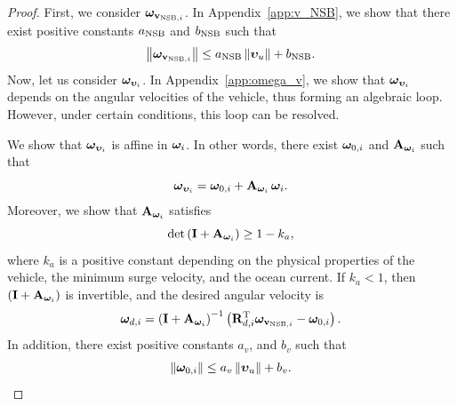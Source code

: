 \begin{proof}
    
    
    First, we consider $\bm{\omega}_{\mathbf{v}_{{\rm NSB}, i}}$.
    In Appendix~\ref{app:v_NSB}, we show that there exist positive constants $a_{\rm NSB}$ and $b_{\rm NSB}$ such that 
    \begin{equation}
        \left\|\bm{\omega}_{\mathbf{v}_{{\rm NSB}, i}}\right\| \leq a_{\rm NSB}\left\|\bm{\upsilon}_u\right\| + b_{\rm NSB}.
        \label{eq:NSB_R_omega_NSB_bound}
    \end{equation}
    Now, let us consider $\bm{\omega}_{\bm{\upsilon}_i}$.
    In Appendix~\ref{app:omega_v}, we show that $\bm{\omega}_{\bm{\upsilon}_i}$ depends on the angular velocities of the vehicle, thus forming an algebraic loop.
    However, under certain conditions, this loop can be resolved.

    

    We show that $\bm{\omega}_{\bm{\upsilon}_{i}}$ is affine in $\bm{\omega}_i$.
    In other words, there exist $\bm{\omega}_{0, i}$ and $\mathbf{A}_{\bm{\omega}_i}$ such that \vspace*{-0.35em}
    \begin{equation}
        \bs{\omega}_{\bvel_{i}} = \bs{\omega}_{0, i} + \mat{A}_{\bs{\omega}_i}\,\bs{\omega}_i.
        \vspace*{-0.15em}
    \end{equation}
    Moreover, we show that $\mathbf{A}_{\bm{\omega}_i}$ satisfies 
    \begin{equation}
        \det\left(\mat{I} + \mat{A}_{\bs{\omega}_i}\right) \geq 1 - k_a,
        \label{eq:NSB_R_det_A_bound}
        \vspace*{-0.25em}
    \end{equation}
    where $k_a$ is a positive constant depending on the physical properties of the vehicle, the minimum surge velocity, and the ocean current.
    If $k_a < 1$, then $\left(\mathbf{I} + \mathbf{A}_{\bm{\omega}_i}\right)$ is invertible, and the desired angular velocity is 
    \begin{equation}
        \bm{\omega}_{d, i} = \left(\mathbf{I} + \mathbf{A}_{\bm{\omega}_i}\right)^{-1}\left(\mathbf{R}_{d, i}^{\mathrm{T}} \bm{\omega}_{\mathbf{v}_{{\rm NSB}, i}} - \bm{\omega}_{0, i}\right).
    \end{equation}
    In addition, there exist positive constants $a_v$, and $b_v$ such that 
    \begin{equation}
        \left\|\bm{\omega}_{0, i}\right\| \leq a_v\left\|\bm{\upsilon}_u\right\| + b_v.
        \label{eq:NSB_R_omega_0_bound}
    \end{equation}


\end{proof}
